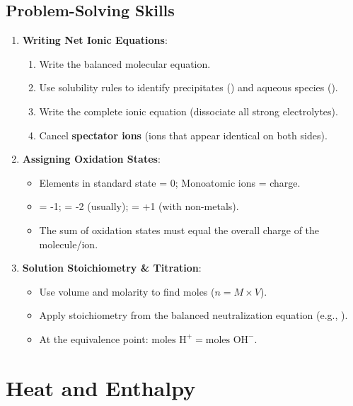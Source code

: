 \documentclass[11pt]{article}
\begin{document}
\subsection{Problem-Solving Skills}
\begin{enumerate}
    \item \textbf{Writing Net Ionic Equations}:
    \begin{enumerate}[label=\alph*)]
        \item Write the balanced molecular equation.
        \item Use solubility rules to identify precipitates () and aqueous species ().
        \item Write the complete ionic equation (dissociate all strong electrolytes).
        \item Cancel \textbf{spectator ions} (ions that appear identical on both sides).
    \end{enumerate}

    \item \textbf{Assigning Oxidation States}:
    \begin{itemize}
        \item Elements in standard state = 0; Monoatomic ions = charge.
        \item {} = -1;  = -2 (usually);  = +1 (with non-metals).
        \item The sum of oxidation states must equal the overall charge of the molecule/ion.
    \end{itemize}

    \item \textbf{Solution Stoichiometry \& Titration}:
    \begin{itemize}
        \item Use volume and molarity to find moles ($n = M \times V$).
        \item Apply stoichiometry from the balanced neutralization equation (e.g., ).
        \item At the equivalence point: $\text{moles H}^+ = \text{moles OH}^-$.
    \end{itemize}
\end{enumerate}

\newpage

\section{Heat and Enthalpy}
\end{document}
